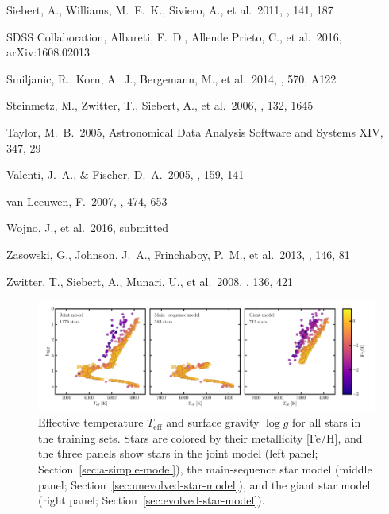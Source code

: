 \documentclass[preprint,trackchanges]{aastex}
\newcommand{\teff}{T_{\mathrm{eff}}}
\newcommand{\logg}{\log g}
\begin{document}
\begin{thebibliography}{dummy}
 Siebert, A., Williams, M.~E.~K., Siviero, A., et al.\ 2011, \aj, 141, 187 

 SDSS Collaboration, Albareti, F.~D., Allende Prieto, C., et al.\ 2016, arXiv:1608.02013 

 Smiljanic, R., Korn, A.~J., Bergemann, M., et al.\ 2014, \aap, 570, A122 

 Steinmetz, M., Zwitter, T., Siebert, A., et al.\ 2006, \aj, 132, 1645 

 Taylor, M.~B.\ 2005, Astronomical Data Analysis Software and Systems XIV, 347, 29 

 Valenti, J.~A., \& Fischer, D.~A.\ 2005, \apjs, 159, 141 

 van Leeuwen, F.\ 2007, \aap, 474, 653 

 Wojno, J., et al.\ 2016, submitted

 Zasowski, G., Johnson, J.~A., Frinchaboy, P.~M., et al.\ 2013, \aj, 146, 81 

 Zwitter, T., Siebert, A., Munari, U., et al.\ 2008, \aj, 136, 421 

\end{thebibliography}

\clearpage

\begin{figure}[p]
\includegraphics[width=\textwidth]{figures/hrd-train-set.pdf}
\caption{Effective temperature $\teff$ and surface gravity $\logg$ for all stars in the training sets. Stars are colored by their metallicity [Fe/H], and the three panels show stars in the joint model (left panel; Section~\ref{sec:a-simple-model}), the main-sequence star model (middle panel; Section~\ref{sec:unevolved-star-model}), and the giant star model (right panel; Section~\ref{sec:evolved-star-model}).\label{fig:training-set-hrd}}
\end{figure}
\end{document}

